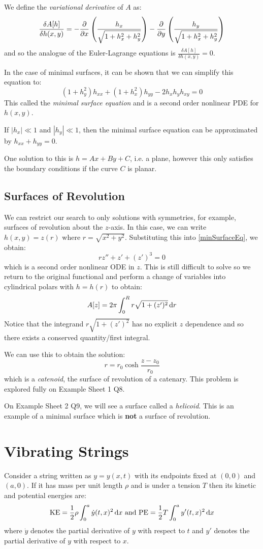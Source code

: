\documentclass[../main.tex]{subfiles}
\begin{document}
We define the \textit{variational derivative} of $A$ as:
\[
  \frac{\delta A[h]}{\delta h(x, y)} = - \pderiv{}{x}\left(\frac{h_x}{\sqrt{1 + h^2_x + h^2_y}}\right) - \pderiv{}{y}\left(\frac{h_y}{\sqrt{1 + h^2_x + h^2_y}}\right)
\]
and so the analogue of the Euler-Lagrange equations is $\frac{\delta A[h]}{\delta h(x, y)} = 0$.

In the case of minimal surfaces, it can be shown that we can simplify this equation to:
\begin{equation}
  (1 + h^2_y)h_{x x} + (1 + h^2_x)h_{y y} - 2h_xh_yh_{x y} = 0 \label{minSurfaceEq}
\end{equation}
This called the \textit{minimal surface equation} and is a second order nonlinear PDE for $h(x, y)$.
\begin{remark}
  If $|h_x| \ll 1$ and $|h_{y}| \ll 1$, then the minimal surface equation can be approximated by $h_{x x} + h_{y y} = 0$.
\end{remark}
One solution to this is $h = Ax + By + C$, i.e. a plane, however this only satisfies the boundary conditions if the curve $C$ is planar.
\subsection{Surfaces of Revolution}
We can restrict our search to only solutions with symmetries, for example, surfaces of revolution about the $z$-axis.
In this case, we can write $h(x, y) = z(r)$ where $r = \sqrt{x^2 + y^2}$.
Substituting this into \cref{minSurfaceEq}, we obtain:
\[
  rz'' + z' + (z')^3 = 0
\]
which is a second order nonlinear ODE in $z$.
This is still difficult to solve so we return to the original functional and perform a change of variables into cylindrical polars with $h = h(r)$ to obtain:
\[
  A[z] = 2\pi \int_{0}^{R} r \sqrt{1 + (z')^2} \d{r}
\]
Notice that the integrand $r\sqrt{1 + (z')^2}$ has no explicit $z$ dependence and so there exists a conserved quantity/first integral.

We can use this to obtain the solution:
\[
  r = r_0 \cosh \frac{z - z_0}{r_0}
\]
which is a \textit{catenoid}, the surface of revolution of a catenary.
This problem is explored fully on Example Sheet 1 Q8.
\begin{remark}
  On Example Sheet 2 Q9, we will see a surface called a \textit{helicoid}.
  This is an example of a minimal surface which is \textbf{not} a surface of revolution.
\end{remark}
\section{Vibrating Strings}
Consider a string written as $y = y(x, t)$ with its endpoints fixed at $(0, 0)$ and $(a, 0)$.
If it has mass per unit length $\rho$ and is under a tension $T$ then its kinetic and potential energies are:
\[
  \text{KE} = \frac{1}{2} \rho \int_{0}^{a} \dot{y}(t, x)^2 \d{x} \text{ and } \text{PE} = \frac{1}{2} T \int_{0}^{a} y'(t, x)^2 \d{x}
\]
where $\dot{y}$ denotes the partial derivative of $y$ with respect to $t$ and $y'$ denotes the partial derivative of $y$ with respect to $x$.
\end{document}
